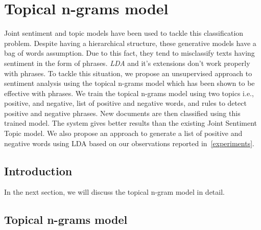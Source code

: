 
\chapter{Topical n-grams model} %

\label{topicalngram} %



Joint sentiment and topic models have been used to tackle this classification problem. Despite having a hierarchical structure, these generative models have
a bag of words assumption. Due to this fact, they tend to misclassify texts having sentiment in the form of phrases. \textit{LDA} and it's extensions don't 
work properly with phrases. To tackle this situation, we propose an unsupervised approach to sentiment analysis using the topical n-grams model which has been
shown to be effective with phrases. We train the topical n-grams model using two topics i.e., positive, and negative, list of positive and negative
words, and rules to detect positive and negative phrases. New documents are then classified using this trained model. The system gives better results than the 
existing Joint Sentiment Topic model. We also propose an approach to generate a list of positive and negative words using LDA based on our observations reported in~\cref{experiments}.

\section{Introduction}





In the next section, we will discuss the topical n-gram model in detail.

\section{Topical n-grams model}

